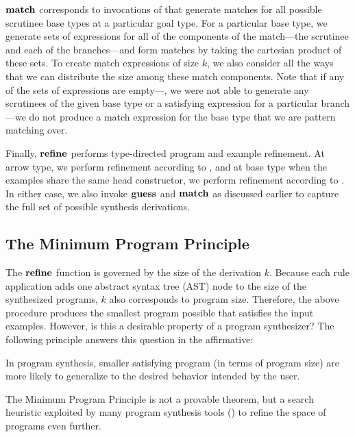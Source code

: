 $\mathbf{match}$ corresponds to invocations of  that generate matches for all possible scrutinee base types at a particular goal type.
For a particular base type, we generate sets of expressions for all of the components of the match---the scrutinee and each of the branches---and form matches by taking the cartesian product of these sets.
To create match expressions of size $k$, we also consider all the ways that we can distribute the size among these match components.
Note that if any of the sets of expressions are empty---\ie, we were not able to generate any scrutinees of the given base type or a satisfying expression for a particular branch---we do not produce a match expression for the base type that we are pattern matching over.

Finally, $\mathbf{refine}$ performs type-directed program and example refinement.
At arrow type, we perform refinement according to , and at base type when the examples share the same head constructor, we perform refinement according to .
In either case, we also invoke $\mathbf{guess}$ and $\mathbf{match}$ as discussed earlier to capture the full set of possible synthesis derivations.

\subsection{The Minimum Program Principle}
\label{subsec:the-minimum-program-principle}

The $\mathbf{refine}$ function is governed by the size of the derivation $k$.
Because each rule application adds one abstract syntax tree (AST) node to the size of the synthesized programs, $k$ also corresponds to program size.
Therefore, the above procedure produces the smallest program possible that satisfies the input examples.
However, is this a desirable property of a program synthesizer?
The following principle answers this question in the affirmative:
\begin{definition}
  In program synthesis, smaller satisfying program (in terms of program size) are more likely to generalize to the desired behavior intended by the user.
\end{definition}
The Minimum Program Principle is not a provable theorem, but a search heuristic exploited by many program synthesis tools () to refine the space of programs even further.

